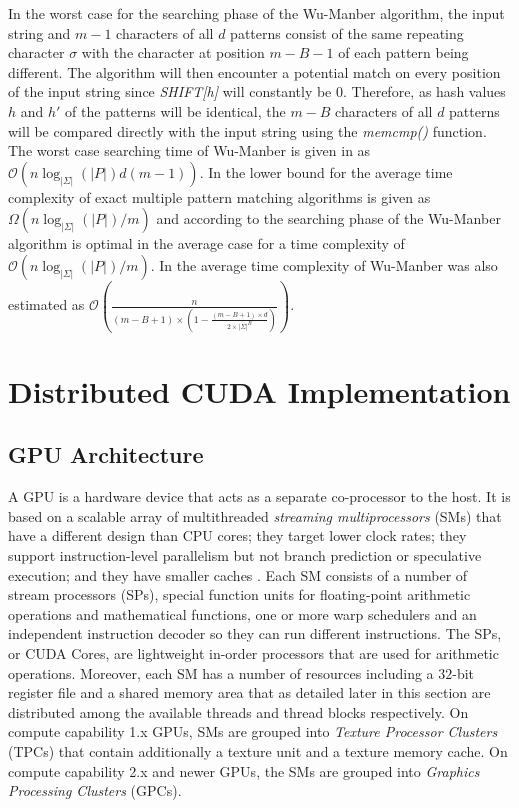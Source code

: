 \documentclass{ws-ijait}
\begin{document}
In the worst case for the searching phase of the Wu-Manber algorithm, the input string and $m-1$ characters of all $d$ patterns consist of the same repeating character $\sigma$ with the character at position $m - B - 1$ of each pattern being different. The algorithm will then encounter a potential match on every position of the input string since \textit{SHIFT[h]} will constantly be $0$. Therefore, as hash values $h$ and $h'$ of the patterns will be identical, the $m - B$ characters of all $d$ patterns will be compared directly with the input string using the \textit{memcmp()} function. The worst case searching time of Wu-Manber is given in \cite{Chen2005} as $\mathcal{O}(n\log_{|\Sigma|}(|P|)d(m-1))$. In \cite{Navarro2004} the lower bound for the average time complexity of exact multiple pattern matching algorithms is given as $\Omega(n\log_{|\Sigma|}(|P|)/m)$ and according to \cite{Chen2005} the searching phase of the Wu-Manber algorithm is optimal in the average case for a time complexity of $\mathcal{O}(n\log_{|\Sigma|}(|P|)/m)$. In \cite{Liu2005} the average time complexity of Wu-Manber was also estimated as $\mathcal{O}(\frac{n}{(m-B+1)\times(1-\frac{(m-B+1)\times d}{2\times |\Sigma|^B})})$.


\section{Distributed CUDA Implementation}
\label{sec:distrcudawm}

\subsection{GPU Architecture}
\label{sec:GPU-Architecture}

A GPU is a hardware device that acts as a separate co-processor to the host. It is based on a scalable array of multithreaded \textit{streaming multiprocessors} (SMs) that have a different design than CPU cores; they target lower clock rates; they support instruction-level parallelism but not branch prediction or speculative execution; and they have smaller caches \cite{Wilt2013}. Each SM consists of a number of stream processors (SPs), special function units for floating-point arithmetic operations and mathematical functions, one or more warp schedulers and an independent instruction decoder so they can run different instructions. The SPs, or CUDA Cores, are lightweight in-order processors that are used for arithmetic operations. Moreover, each SM has a number of resources including a $32$-bit register file and a shared memory area that as detailed later in this section are distributed among the available threads and thread blocks respectively. On compute capability 1.x GPUs, SMs are grouped into \textit{Texture Processor Clusters} (TPCs) that contain additionally a texture unit and a texture memory cache. On compute capability 2.x and newer GPUs, the SMs are grouped into \textit{Graphics Processing Clusters} (GPCs).
\end{document}
